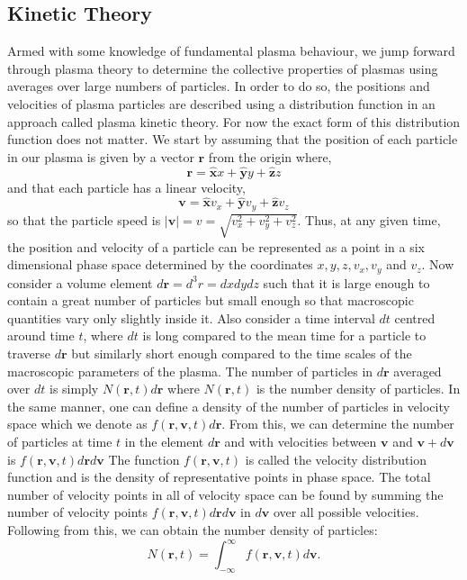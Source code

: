 \subsection{Kinetic Theory}
Armed with some knowledge of fundamental plasma behaviour, we jump forward through plasma theory to determine the collective properties of plasmas using averages over large numbers of particles. In order to do so, the positions and velocities of plasma particles are described using a distribution function in an approach called plasma kinetic theory. For now the exact form of this distribution function does not matter. We start by assuming that the position of each particle in our plasma is given by a vector $\mathbf{r}$ from the origin where,
\begin{equation}
\label{eq:KT_position}
\mathbf{r} = \mathbf{\hat{x}}x + \mathbf{\hat{y}}y + \mathbf{\hat{z}}z
\end{equation}
and that each particle has a linear velocity,
\begin{equation}
\label{eq:KT_velocity}
\mathbf{v} = \mathbf{\hat{x}}v_x + \mathbf{\hat{y}}v_y + \mathbf{\hat{z}}v_z
\end{equation}
so that the particle speed is $\vert \mathbf{v} \vert = v = \sqrt{v_x^2 + v_y^2 + v_z^2}$. Thus, at any given time, the position and velocity of a particle can be represented as a point in a six dimensional phase space determined by the coordinates $x, y, z, v_x, v_y$ and $v_z$. Now consider a volume element $d\mathbf{r} = d^3r = dxdydz$ such that it is large enough to contain a great number of particles but small enough so that macroscopic quantities vary only slightly inside it. Also consider a time interval $dt$ centred around time $t$, where $dt$ is long compared to the mean time for a particle to traverse $d\mathbf{r}$ but similarly short enough compared to the time scales of the macroscopic parameters of the plasma. The number of particles in $d\mathbf{r}$ averaged over $dt$ is simply $N(\mathbf{r},t)d\mathbf{r}$ where $N(\mathbf{r},t)$ is the number density of particles. In the same manner, one can define a density of the number of particles in velocity space which we denote as $f(\mathbf{r}, \mathbf{v}, t)d\mathbf{r}$. From this, we can determine the number of particles at time $t$ in the element $d\mathbf{r}$ and with velocities between $\mathbf{v}$ and $\mathbf{v} + d\mathbf{v}$ is $f(\mathbf{r}, \mathbf{v}, t)d\mathbf{r}d\mathbf{v}$ The function $f(\mathbf{r}, \mathbf{v}, t)$ is called the velocity distribution function and is the density of representative points in phase space. The total number of velocity points in all of velocity space can be found by summing the number of velocity points $f(\mathbf{r}, \mathbf{v}, t)d\mathbf{r}d\mathbf{v}$ in $d\mathbf{v}$ over all possible velocities. Following from this, we can obtain the number density of particles:
\begin{equation}
\label{eq:KT_number_density}
N(\mathbf{r},t) =\int^\infty_{-\infty}  f(\mathbf{r}, \mathbf{v}, t) d\mathbf{v}.
\end{equation}

